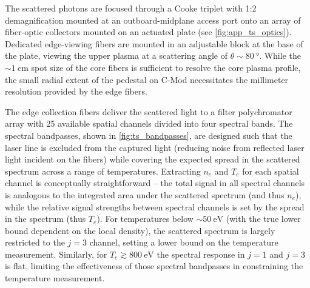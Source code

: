 The scattered photons are focused through a Cooke triplet with 1:2 demagnification mounted at an outboard-midplane access port onto an array of fiber-optic collectors mounted on an actuated plate (see \cref{fig:app_ts_optics}).  Dedicated edge-viewing fibers are mounted in an adjustable block at the base of the plate, viewing the upper plasma at a scattering angle of $\theta \sim \SI{80}{\degree}$.  While the $\sim\SI{1}{\centi\meter}$ spot size of the core fibers is sufficient to resolve the core plasma profile, the small radial extent of the pedestal on C-Mod necessitates the millimeter resolution provided by the edge fibers.

\begin{figure}[t]
 \pushtooutside
\end{figure}

The edge collection fibers deliver the scattered light to a filter polychromator array with 25 available spatial channels divided into four spectral bands.  The spectral bandpasses, shown in \cref{fig:ts_bandpasses}, are designed such that the laser line is excluded from the captured light (reducing noise from reflected laser light incident on the fibers) while covering the expected spread in the scattered spectrum across a range of temperatures.  Extracting $n_e$ and $T_e$ for each spatial channel is conceptually straightforward -- the total signal in all spectral channels is analogous to the integrated area under the scattered spectrum (and thus $n_e$), while the relative signal strengths between spectral channels is set by the spread in the spectrum (thus $T_e$).  For temperatures below $\sim\SI{50}{\electronvolt}$ (with the true lower bound dependent on the local density), the scattered spectrum is largely restricted to the $j=3$ channel, setting a lower bound on the temperature measurement.  Similarly, 
for $T_e \gtrsim \SI{800}{\electronvolt}$ the spectral response in $j=1$ and $j=3$ is flat, limiting the effectiveness of those spectral bandpasses in constraining the temperature measurement.

